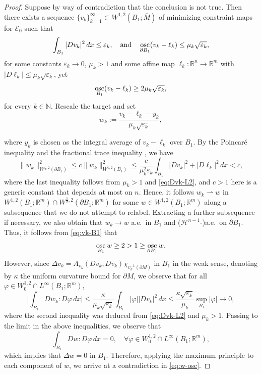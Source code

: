 \documentclass[11pt]{amsart}
\newcommand{\R}{{\mathbb R}}
\newcommand{\N}{{\mathbb N}}
\newcommand{\cE}{{\mathcal E}}
\newcommand{\cH}{{\mathcal H}}
\newcommand{\e}{\varepsilon}
\newcommand{\vp}{\varphi}
\newcommand{\osc}{\operatornamewithlimits{osc}}
\theoremstyle{plain}
\theoremstyle{definition}
\theoremstyle{remark}
\numberwithin{equation}{section}
\begin{document}
\begin{proof}
Suppose by way of contradiction that the conclusion is not true. Then there exists a sequence $\{v_k\}_{k=1}^\infty\subset W^{1,2}(B_1;\overline M)$ of minimizing constraint maps for $\cE_0$ such that 
\begin{equation}
    \label{eq:Dvk-L2}
    \int_{B_1} |Dv_k|^2\,dx \leq \e_k,\quad\text{and}\quad \osc_{\partial B_1} (v_k - \ell_k) \leq \mu_k\sqrt{\e_k},
\end{equation}
for some constants $\e_k\to 0$,  $\mu_k > 1$ and some affine map $\ell_k:\R^n\to\R^m$ with $|D\ell_k|\leq \mu_k\sqrt{\e_k}$, yet 
\begin{equation}
    \label{eq:vk-B1}
    \osc_{B_1} (v_k - \ell_k) \geq 2\mu_k\sqrt{\e_k},
\end{equation}
for every $k\in\N$. Rescale the target and set 
$$
w_k := \frac{v_k - \ell_k - y_k}{\mu_k\sqrt{\e_k}},
$$

where $y_k$ is chosen as the integral average of $v_k - \ell_k$ over $B_1$. By the Poincar\'e inequality and the fractional trace inequality \cite[Chapter 10, Theorem 18.1, Remark 18.2]{DBb}, we have   
$$\| w_k \|_{W^{\frac{1}{2},2}(\partial B_1)}^2 \leq c \| w_k \|_{W^{1,2}(B_1)}^2 \leq \frac{c}{\mu_k^2\e_k} \int_{B_1} |Dv_k|^2 + |D\ell_k|^2 \,dx < c,$$
where the last inequality follows from $\mu_k > 1$ and \eqref{eq:Dvk-L2}, and $c > 1$ here is a generic constant that depends at most on $n$. Hence, it follows $w_k\rightharpoonup w$ in $W^{1,2}(B_1;\R^m)\cap W^{\frac{1}{2},2}(\partial B_1;\R^m)$ for some $w\in W^{1,2}(B_1;\R^m)$ along a subsequence that we do not attempt to relabel. Extracting a further subsequence if necessary, we also obtain that $w_k \to w$ a.e.\ in $B_1$ and ($\cH^{n-1}$-)a.e.\ on $\partial B_1$. Thus, it follows from \eqref{eq:vk-B1} that 
\begin{equation}
    \label{eq:w-osc}
\osc_{B_1} w \geq 2 > 1 \geq \osc_{\partial B_1} w.
\end{equation}
However, since $\Delta v_k = A_{v_k}(Dv_k,Dv_k)\chi_{v_k^{-1}(\partial M)}$ in $B_1$ in the weak sense, denoting by $\kappa$ the uniform curvature bound for $\partial M$, we observe that for all $\vp\in W_0^{1,2}\cap L^\infty(B_1;\R^m)$, 
$$
\bigg|\int_{B_1} Dw_k : D\vp \,dx \bigg| \leq \frac{\kappa}{\mu_k\sqrt{\e_k}} \int_{B_1} |\vp||Dv_k|^2\,dx \leq \frac{\kappa\sqrt{\e_k}}{\mu_k} \sup_{B_1} |\vp|  \to 0,
$$
where the second inequality was deduced from \eqref{eq:Dvk-L2} and $\mu_k > 1$. Passing to the limit in the above inequalities, we observe that 
$$
\int_{B_1} Dw: D\vp\,dx = 0,\quad\forall \vp\in W_0^{1,2}\cap L^\infty(B_1;\R^m),
$$
which implies that $\Delta w = 0$ in $B_1$. Therefore, applying the maximum principle to each component of $w$, we arrive at a contradiction in \eqref{eq:w-osc}.
\end{proof}
\end{document}
